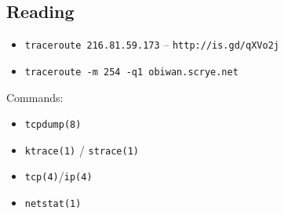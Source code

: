 \documentclass[xga]{xdvislides}
\begin{document}
\subsection{Reading}
\begin{itemize}
	\item \verb+traceroute 216.81.59.173+ -- \verb+http://is.gd/qXVo2j+
	\item \verb+traceroute -m 254 -q1 obiwan.scrye.net+
\end{itemize}
\vspace{.5in}
Commands:
\begin{itemize}
	\item \verb+tcpdump(8)+
	\item \verb+ktrace(1)+ / \verb+strace(1)+
	\item \verb+tcp(4)+/\verb+ip(4)+
	\item \verb+netstat(1)+
\end{itemize}
\end{document}
